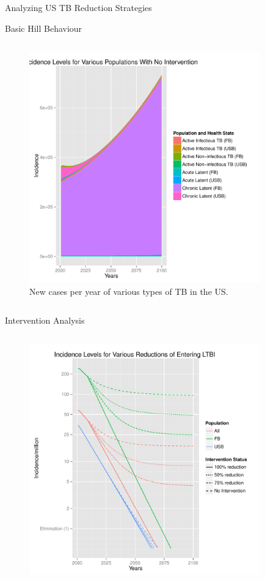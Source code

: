 \documentclass[final]{beamer}
\begin{document}
\begin{frame}
\begin{columns}
\begin{column}{.3\textwidth}
\begin{block}{Analyzing US TB Reduction Strategies}
\begin{block}{Basic Hill Behaviour}
\begin{column}{.45\textwidth}
\begin{figure}[h]
\begin{center}
                \includegraphics[height=10cm,width=\textwidth]{incPlotTotal}
              \end{center}
              \caption{New cases per year of various types of TB in the US.}
              \label{fig:incPlotTotal}
            \end{figure}
          \end{column}
        \end{block}
        \begin{block}{Intervention Analysis}
          \vspace{-1.6em}
          \begin{column}{.45\textwidth}
            \begin{figure}[h]
              \begin{center}
                \includegraphics[height=10cm,width=\textwidth]{incidencePlotRedEnLTBI}

\end{center}
\end{figure}
\end{column}
\end{block}
\end{block}
\end{column}
\end{columns}
\end{frame}
\end{document}

